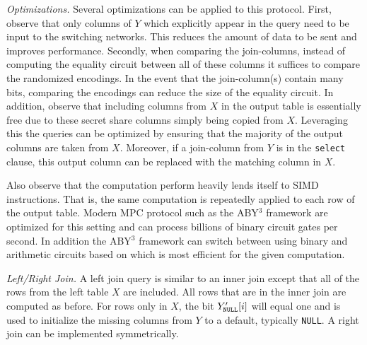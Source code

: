 
\iffullversion
\emph{Optimizations.}
Several optimizations can be applied to this protocol. First, observe that only columns of $Y$ which explicitly appear in the query need to be input to the switching networks. This reduces the amount of data to be sent and improves performance. Secondly, when comparing the join-columns, instead of computing the equality circuit between all of these columns it suffices to compare the randomized encodings. In the event that the join-column(s) contain many bits, comparing the encodings can reduce the size of the equality circuit. In addition, observe that including columns from $X$ in the output table is essentially free due to these secret share columns simply being copied from $X$. Leveraging this the queries can be optimized by ensuring that the majority of the output columns are taken from $X$. Moreover, if a join-column from $Y$ is in the \texttt{select} clause, this output column can be replaced with the matching column in $X$.

Also observe that the computation perform heavily lends itself to SIMD instructions. That is, the same computation is repeatedly applied to each row of the output table. Modern MPC protocol such as the ABY$^3$ framework \cite{aby3,highthroughput} are optimized for this setting and can process billions of binary circuit gates per second\cite{highthroughput}. In addition the ABY$^3$ framework can switch between using binary and arithmetic circuits based on which is most efficient for the given computation. 
\fi

\emph{Left/Right Join.}
A left join query is similar to an inner join except that all of the rows from the left table $X$ are included. All rows that are in the inner join are computed as before. For rows only in $X$, the bit $Y_\texttt{NULL}'[i]$ will equal one and is used to initialize the missing columns from $Y$ to a default, typically \texttt{NULL}. A right join can be implemented symmetrically.

